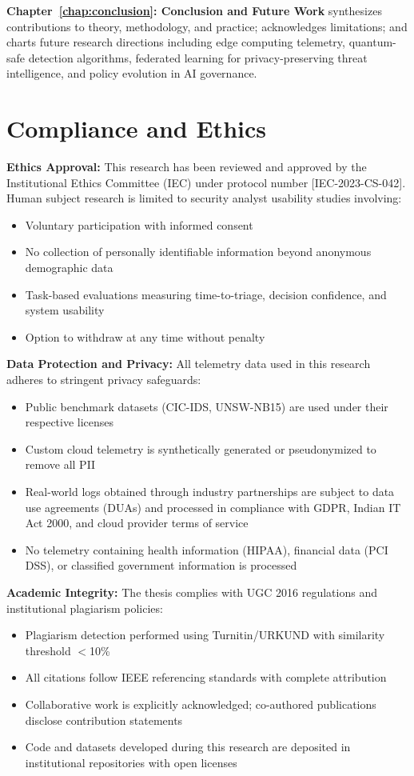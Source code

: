\textbf{Chapter~\ref{chap:conclusion}: Conclusion and Future Work} synthesizes contributions to theory, methodology, and practice; acknowledges limitations; and charts future research directions including edge computing telemetry, quantum-safe detection algorithms, federated learning for privacy-preserving threat intelligence, and policy evolution in AI governance.

\section{Compliance and Ethics}\label{sec:intro-compliance}
\textbf{Ethics Approval:} This research has been reviewed and approved by the Institutional Ethics Committee (IEC) under protocol number [IEC-2023-CS-042]. Human subject research is limited to security analyst usability studies involving:
\begin{itemize}
    \item Voluntary participation with informed consent
    \item No collection of personally identifiable information beyond anonymous demographic data
    \item Task-based evaluations measuring time-to-triage, decision confidence, and system usability
    \item Option to withdraw at any time without penalty
\end{itemize}

\textbf{Data Protection and Privacy:} All telemetry data used in this research adheres to stringent privacy safeguards:
\begin{itemize}
    \item Public benchmark datasets (CIC-IDS, UNSW-NB15) are used under their respective licenses
    \item Custom cloud telemetry is synthetically generated or pseudonymized to remove all PII
    \item Real-world logs obtained through industry partnerships are subject to data use agreements (DUAs) and processed in compliance with GDPR, Indian IT Act 2000, and cloud provider terms of service
    \item No telemetry containing health information (HIPAA), financial data (PCI DSS), or classified government information is processed
\end{itemize}

\textbf{Academic Integrity:} The thesis complies with UGC 2016 regulations and institutional plagiarism policies:
\begin{itemize}
    \item Plagiarism detection performed using Turnitin/URKUND with similarity threshold $<$10\%
    \item All citations follow IEEE referencing standards with complete attribution
    \item Collaborative work is explicitly acknowledged; co-authored publications disclose contribution statements
    \item Code and datasets developed during this research are deposited in institutional repositories with open licenses
\end{itemize}

